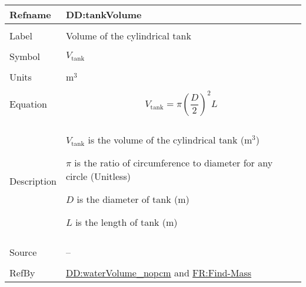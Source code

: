 \documentclass[12pt]{article}
\begin{document}
\vspace{\baselineskip}
\noindent
\begin{minipage}{\textwidth}
\begin{tabular}{>{\raggedright}p{}>{\raggedright\arraybackslash}p{}}
\toprule \textbf{Refname} & \textbf{DD:tankVolume}
\label{DD:tankVolume}
\\ \midrule \\
Label & Volume of the cylindrical tank
        
\\ \midrule \\
Symbol & ${V_{\text{tank}}}$
         
\\ \midrule \\
Units & ${\text{m}^{3}}$
        
\\ \midrule \\
Equation & \begin{displaymath}
           {V_{\text{tank}}}=π \left(\frac{D}{2}\right)^{2} L
           \end{displaymath}
\\ \midrule \\
Description & \begin{symbDescription}
              \item{${V_{\text{tank}}}$ is the volume of the cylindrical tank (${\text{m}^{3}}$)}
              \item{$π$ is the ratio of circumference to diameter for any circle (Unitless)}
              \item{$D$ is the diameter of tank (${\text{m}}$)}
              \item{$L$ is the length of tank (${\text{m}}$)}
              \end{symbDescription}
\\ \midrule \\
Source & --
         
\\ \midrule \\
RefBy & \hyperref[DD:waterVolume.nopcm]{DD:waterVolume\_nopcm} and \hyperref[findMass]{FR:Find-Mass}
        
\\ \bottomrule
\end{tabular}
\end{minipage}
\end{document}
